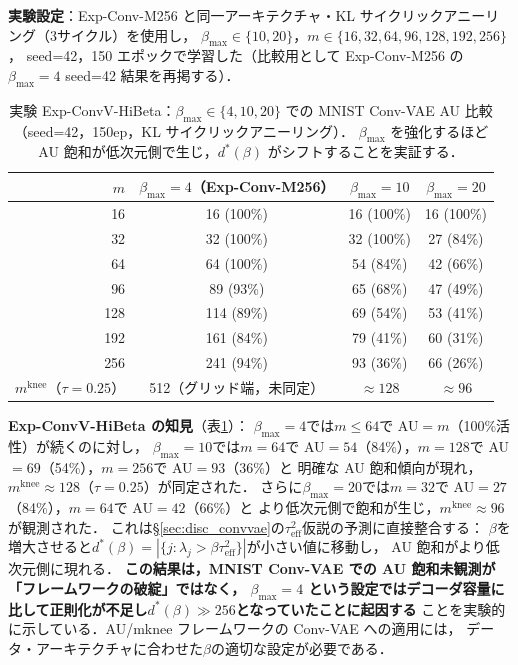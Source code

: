 \documentclass[11pt,a4paper]{jsarticle}
\newcommand{\mknee}{m^{\mathrm{knee}}}
\begin{document}
\textbf{実験設定}：Exp-Conv-M256 と同一アーキテクチャ・KL サイクリックアニーリング（3サイクル）を使用し，
$\beta_{\max} \in \{10, 20\}$，$m \in \{16, 32, 64, 96, 128, 192, 256\}$，
seed=42，150 エポックで学習した（比較用として Exp-Conv-M256 の$\beta_{\max}=4$ seed=42 結果を再掲する）．

\begin{table}[H]
\centering
\caption{実験 Exp-ConvV-HiBeta：$\beta_{\max} \in \{4, 10, 20\}$ での MNIST Conv-VAE AU 比較
（seed=42，150ep，KL サイクリックアニーリング）．
$\beta_{\max}$ を強化するほど AU 飽和が低次元側で生じ，$d^*(\beta)$ がシフトすることを実証する．}
\label{tab:hibeta}
\small
\begin{tabular}{r ccc}
\toprule
$m$ & $\beta_{\max}=4$（Exp-Conv-M256） & $\beta_{\max}=10$ & $\beta_{\max}=20$ \\
\midrule
 16  & 16  (100\%)& 16 (100\%) & 16 (100\%) \\
 32  & 32  (100\%)& 32 (100\%) & 27 (84\%)  \\
 64  & 64  (100\%)& 54 (84\%)  & 42 (66\%)  \\
 96  & 89  (93\%) & 65 (68\%)  & 47 (49\%)  \\
128  & 114 (89\%) & 69 (54\%)  & 53 (41\%)  \\
192  & 161 (84\%) & 79 (41\%)  & 60 (31\%)  \\
256  & 241 (94\%) & 93 (36\%)  & 66 (26\%)  \\
\midrule
$\mknee$（$\tau=0.25$） & 512（グリッド端，未同定） & $\approx 128$ & $\approx 96$ \\
\bottomrule
\end{tabular}
\end{table}

\textbf{Exp-ConvV-HiBeta の知見}（表\ref{tab:hibeta}）：
$\beta_{\max}=4$では$m \leq 64$で AU$=m$（100\%活性）が続くのに対し，
$\beta_{\max}=10$では$m=64$で AU$=54$（84\%），$m=128$で AU$=69$（54\%），$m=256$で AU$=93$（36\%）と
明確な AU 飽和傾向が現れ，$\mknee \approx 128$（$\tau=0.25$）が同定された．
さらに$\beta_{\max}=20$では$m=32$で AU$=27$（84\%），$m=64$で AU$=42$（66\%）と
より低次元側で飽和が生じ，$\mknee \approx 96$が観測された．
これは§\ref{sec:disc_convvae}の$\tau^2_\mathrm{eff}$仮説の予測に直接整合する：
$\beta$を増大させると$d^*(\beta) = |\{j: \lambda_j > \beta\tau^2_\mathrm{eff}\}|$が小さい値に移動し，
AU 飽和がより低次元側に現れる．
\textbf{この結果は，MNIST Conv-VAE での AU 飽和未観測が「フレームワークの破綻」ではなく，
$\beta_{\max}=4$ という設定ではデコーダ容量に比して正則化が不足し$d^*(\beta) \gg 256$となっていたことに起因する}
ことを実験的に示している．AU/mknee フレームワークの Conv-VAE への適用には，
データ・アーキテクチャに合わせた$\beta$の適切な設定が必要である．
\end{document}

